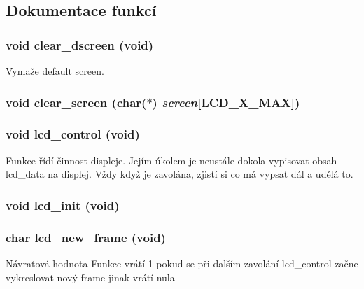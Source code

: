 \subsection{Dokumentace funkcí}
\subsubsection[{clear\_\-dscreen}]{\setlength{\rightskip}{0pt plus 5cm}void clear\_\-dscreen (void)}\label{lcd_8h_af632fc4d520fbb4468baea39b68bc17e}


Vymaže default screen. 
\subsubsection[{clear\_\-screen}]{\setlength{\rightskip}{0pt plus 5cm}void clear\_\-screen (char($\ast$) {\em screen}[LCD\_\-X\_\-MAX])}\label{lcd_8h_a0d72a8b3fb4557babb0f1c61018f2327}
\subsubsection[{lcd\_\-control}]{\setlength{\rightskip}{0pt plus 5cm}void lcd\_\-control (void)}\label{lcd_8h_aac5a8ac84d029ba77193f158761d10da}
Funkce řídí činnost displeje. Jejím úkolem je neustále dokola vypisovat obsah lcd\_\-data na displej. Vždy když je zavolána, zjistí si co má vypsat dál a udělá to. 
\subsubsection[{lcd\_\-init}]{\setlength{\rightskip}{0pt plus 5cm}void lcd\_\-init (void)}\label{lcd_8h_a6842775ba83d166f02b8fef8bb63b1e6}
\subsubsection[{lcd\_\-new\_\-frame}]{\setlength{\rightskip}{0pt plus 5cm}char lcd\_\-new\_\-frame (void)}\label{lcd_8h_a2fdcaa04d2a5ef5f829a2c0503b95009}
\begin{DoxyReturn}{Návratová hodnota}
Funkce vrátí 1 pokud se při dalším zavolání lcd\_\-control začne vykreslovat nový frame jinak vrátí nula 
\end{DoxyReturn}
